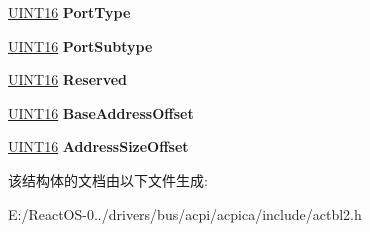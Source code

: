 \begin{DoxyCompactItemize}
\item 
\mbox{\label{structacpi__dbg2__device_ab058d7997d53a3f5bc32e8ecfefc9484}} 
\hyperlink{_processor_bind_8h_a09f1a1fb2293e33483cc8d44aefb1eb1}{U\+I\+N\+T16} {\bfseries Port\+Type}
\item 
\mbox{\label{structacpi__dbg2__device_a94c4a59445a6c6199419e6b7ad7bac7e}} 
\hyperlink{_processor_bind_8h_a09f1a1fb2293e33483cc8d44aefb1eb1}{U\+I\+N\+T16} {\bfseries Port\+Subtype}
\item 
\mbox{\label{structacpi__dbg2__device_a040aef3a86d9daee5a7e63441fdba6fe}} 
\hyperlink{_processor_bind_8h_a09f1a1fb2293e33483cc8d44aefb1eb1}{U\+I\+N\+T16} {\bfseries Reserved}
\item 
\mbox{\label{structacpi__dbg2__device_aa005a555fbf33f794bc9a0628a32b989}} 
\hyperlink{_processor_bind_8h_a09f1a1fb2293e33483cc8d44aefb1eb1}{U\+I\+N\+T16} {\bfseries Base\+Address\+Offset}
\item 
\mbox{\label{structacpi__dbg2__device_a4c3205f93a14ba86d65ee8445cec7bea}} 
\hyperlink{_processor_bind_8h_a09f1a1fb2293e33483cc8d44aefb1eb1}{U\+I\+N\+T16} {\bfseries Address\+Size\+Offset}
\end{DoxyCompactItemize}


该结构体的文档由以下文件生成\+:\begin{DoxyCompactItemize}
\item 
E\+:/\+React\+O\+S-\/0../drivers/bus/acpi/acpica/include/actbl2.\+h\end{DoxyCompactItemize}
